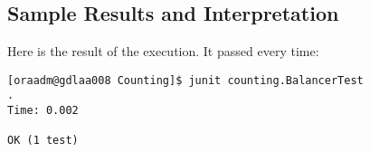 \subsection{Sample Results and Interpretation}
\par
Here is  the result of the execution. It passed every time:
\par
\hfill
\begin{verbatim}
[oraadm@gdlaa008 Counting]$ junit counting.BalancerTest
.
Time: 0.002

OK (1 test)
\end{verbatim}
\hfill
